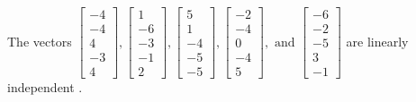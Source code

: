 \begin{exercise}
\begin{exerciseStatement}
  \end{exerciseStatement}
  \begin{exerciseAnswer}
   The vectors \(\left[\begin{array}{r}
-4 \\
-4 \\
4 \\
-3 \\
4
\end{array}\right] , \left[\begin{array}{r}
1 \\
-6 \\
-3 \\
-1 \\
2
\end{array}\right] , \left[\begin{array}{r}
5 \\
1 \\
-4 \\
-5 \\
-5
\end{array}\right] , \left[\begin{array}{r}
-2 \\
-4 \\
0 \\
-4 \\
5
\end{array}\right] , \text{ and } \left[\begin{array}{r}
-6 \\
-2 \\
-5 \\
3 \\
-1
\end{array}\right]\) are 
  	 linearly independent  .
  


  \end{exerciseAnswer}
\end{exercise}
